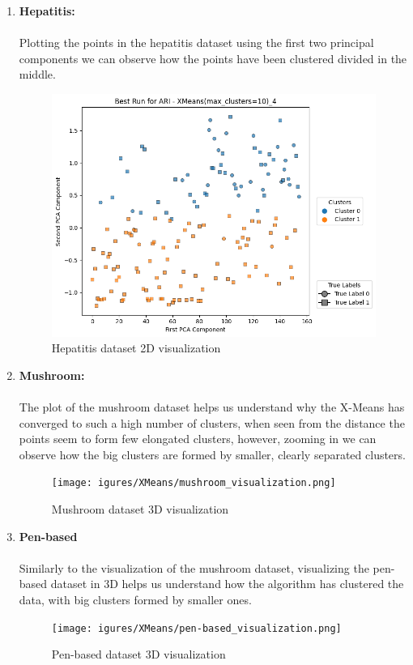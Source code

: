 \begin{enumerate}
    \item \textbf{Hepatitis:}
        \\\\Plotting the points in the hepatitis dataset using the first two principal components we can observe how the points have been clustered divided in the middle.
        \begin{figure}[H]
            \centering
            \includegraphics[width=0.7\linewidth]{figures/XMeans/hepatitis_visualization.png}
            \caption{Hepatitis dataset 2D visualization}
        \end{figure}
    \item \textbf{Mushroom:}
        \\\\The plot of the mushroom dataset helps us understand why the X-Means has converged to such a high number of clusters, when seen from the distance the points seem to form few elongated clusters, however, zooming in we can observe how the big clusters are formed by smaller, clearly separated clusters.
        \begin{figure}[H]
        \centering
        \texttt{[image: igures/XMeans/mushroom\_visualization.png]}
        \caption{Mushroom dataset 3D visualization}
        \end{figure}
    \item \textbf{Pen-based} 
    \\\\ Similarly to the visualization of the mushroom dataset, visualizing the pen-based dataset in 3D helps us understand how the algorithm has clustered the data, with big clusters formed by smaller ones.
    \begin{figure}[H]
    \centering
    \texttt{[image: igures/XMeans/pen-based\_visualization.png]}
    \caption{Pen-based dataset 3D visualization}
\end{figure}

\end{enumerate}